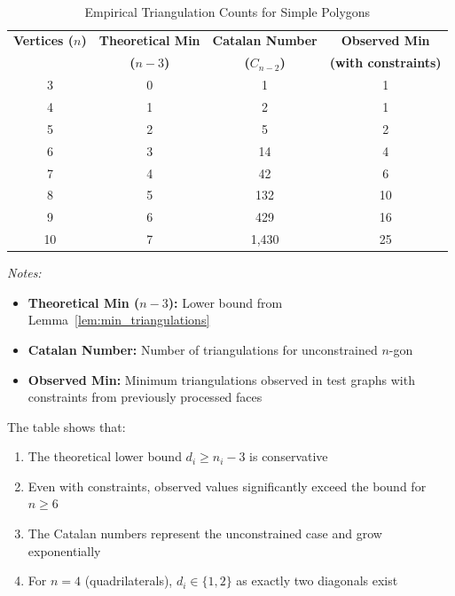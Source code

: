 ﻿﻿\documentclass[12pt,a4paper]{article}
\theoremstyle{definition}
\theoremstyle{remark}
\begin{document}
\begin{table}[H]
	\centering
	\caption{Empirical Triangulation Counts for Simple Polygons}
	\label{tab:triangulation_counts}
	\small
	\begin{tabular}{|c|c|c|c|}
		\hline
		\textbf{Vertices ($n$)} & \textbf{Theoretical Min} & \textbf{Catalan Number} & \textbf{Observed Min}       \\
		\textbf{}               & \textbf{($n-3$)}         & \textbf{($C_{n-2}$)}    & \textbf{(with constraints)} \\
		\hline
		3                       & 0                        & 1                       & 1                           \\
		\hline
		4                       & 1                        & 2                       & 1                           \\
		\hline
		5                       & 2                        & 5                       & 2                           \\
		\hline
		6                       & 3                        & 14                      & 4                           \\
		\hline
		7                       & 4                        & 42                      & 6                           \\
		\hline
		8                       & 5                        & 132                     & 10                          \\
		\hline
		9                       & 6                        & 429                     & 16                          \\
		\hline
		10                      & 7                        & 1,430                   & 25                          \\
		\hline
	\end{tabular}
	\vspace{0.2cm}

	\textit{Notes:}
	\begin{itemize}
		\item \textbf{Theoretical Min ($n-3$):} Lower bound from Lemma~\ref{lem:min_triangulations}
		\item \textbf{Catalan Number:} Number of triangulations for unconstrained $n$-gon
		\item \textbf{Observed Min:} Minimum triangulations observed in test graphs with constraints from previously processed faces
	\end{itemize}

	The table shows that:
	\begin{enumerate}
		\item The theoretical lower bound $d_i \geq n_i - 3$ is conservative
		\item Even with constraints, observed values significantly exceed the bound for $n \geq 6$
		\item The Catalan numbers represent the unconstrained case and grow exponentially
		\item For $n = 4$ (quadrilaterals), $d_i \in \{1, 2\}$ as exactly two diagonals exist
	\end{enumerate}
\end{table}
\end{document}
